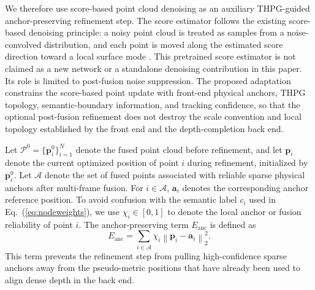 \documentclass[pdflatex,sn-mathphys-num]{sn-jnl}
\begin{document}
We therefore use score-based point cloud denoising as an auxiliary THPG-guided anchor-preserving refinement step. The score estimator follows the existing score-based denoising principle: a noisy point cloud is treated as samples from a noise-convolved distribution, and each point is moved along the estimated score direction toward a local surface mode \cite{bib36}. This pretrained score estimator is not claimed as a new network or a standalone denoising contribution in this paper. Its role is limited to post-fusion noise suppression. The proposed adaptation constrains the score-based point update with front-end physical anchors, THPG topology, semantic-boundary information, and tracking confidence, so that the optional post-fusion refinement does not destroy the scale convention and local topology established by the front end and the depth-completion back end.

Let \(\mathcal{P}^{0}=\{\mathbf{p}^{0}_{i}\}_{i=1}^{N}\) denote the fused point cloud before refinement, and let \(\mathbf{p}_i\) denote the current optimized position of point \(i\) during refinement, initialized by \(\mathbf{p}_i^{0}\). Let \(\mathcal{A}\) denote the set of fused points associated with reliable sparse physical anchors after multi-frame fusion. For \(i\in\mathcal{A}\), \(\mathbf{a}_{i}\) denotes the corresponding anchor reference position. To avoid confusion with the semantic label \(c_i\) used in Eq.~(\ref{eq:nodeweights}), we use \(\chi_i\in[0,1]\) to denote the local anchor or fusion reliability of point \(i\). The anchor-preserving term $E_{\mathrm{anc}}$ is defined as
\begin{equation}
E_{\mathrm{anc}} = \sum_{i\in\mathcal{A}} \chi_i \left\lVert \mathbf{p}_{i}-\mathbf{a}_{i} \right\rVert_2^2.
\label{eq:refine-anchor}
\end{equation}
This term prevents the refinement step from pulling high-confidence sparse anchors away from the pseudo-metric positions that have already been used to align dense depth in the back end.
\end{document}
